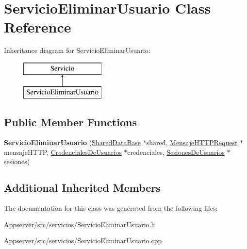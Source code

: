 \hypertarget{classServicioEliminarUsuario}{}\section{Servicio\+Eliminar\+Usuario Class Reference}
\label{classServicioEliminarUsuario}
Inheritance diagram for Servicio\+Eliminar\+Usuario\+:\begin{figure}[H]
\begin{center}
\leavevmode
\includegraphics[height=2.000000cm]{classServicioEliminarUsuario}
\end{center}
\end{figure}
\subsection*{Public Member Functions}
\begin{DoxyCompactItemize}
\item 
{\bfseries Servicio\+Eliminar\+Usuario} (\hyperlink{classSharedDataBase}{Shared\+Data\+Base} $\ast$shared, \hyperlink{classMensajeHTTPRequest}{Mensaje\+H\+T\+T\+P\+Request} $\ast$mensaje\+H\+T\+TP, \hyperlink{classCredencialesDeUsuarios}{Credenciales\+De\+Usuarios} $\ast$credenciales, \hyperlink{classSesionesDeUsuarios}{Sesiones\+De\+Usuarios} $\ast$sesiones)\hypertarget{classServicioEliminarUsuario_a3d9e074088d101735c9a024aac33a07e}{}\label{classServicioEliminarUsuario_a3d9e074088d101735c9a024aac33a07e}

\end{DoxyCompactItemize}
\subsection*{Additional Inherited Members}


The documentation for this class was generated from the following files\+:\begin{DoxyCompactItemize}
\item 
Appserver/src/servicios/Servicio\+Eliminar\+Usuario.\+h\item 
Appserver/src/servicios/Servicio\+Eliminar\+Usuario.\+cpp\end{DoxyCompactItemize}
